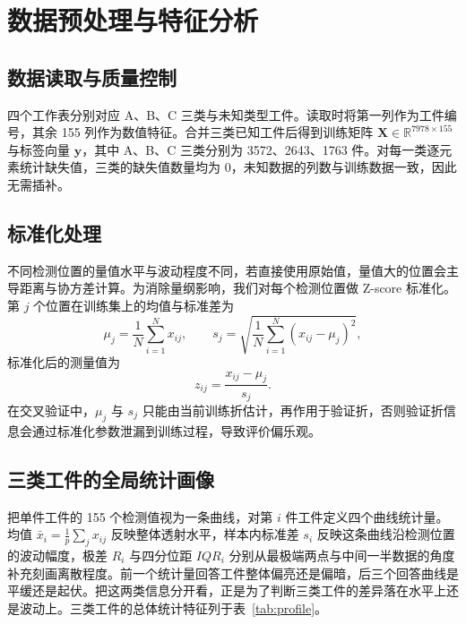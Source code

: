 \documentclass[12pt,a4paper]{article}
\begin{document}
\section{数据预处理与特征分析}
\subsection{数据读取与质量控制}

四个工作表分别对应 A、B、C 三类与未知类型工件。读取时将第一列作为工件编号，其余 155 列作为数值特征。合并三类已知工件后得到训练矩阵 $\mathbf{X}\in\mathbb{R}^{7978\times155}$ 与标签向量 $\mathbf{y}$，其中 A、B、C 三类分别为 3572、2643、1763 件。对每一类逐元素统计缺失值，三类的缺失值数量均为 0，未知数据的列数与训练数据一致，因此无需插补。

\subsection{标准化处理}

不同检测位置的量值水平与波动程度不同，若直接使用原始值，量值大的位置会主导距离与协方差计算。为消除量纲影响，我们对每个检测位置做 Z-score 标准化。第 $j$ 个位置在训练集上的均值与标准差为
\begin{equation}
\mu_j=\frac{1}{N}\sum_{i=1}^{N}x_{ij},\qquad
s_j=\sqrt{\frac{1}{N}\sum_{i=1}^{N}(x_{ij}-\mu_j)^2},
\end{equation}
标准化后的测量值为
\begin{equation}
z_{ij}=\frac{x_{ij}-\mu_j}{s_j}.
\end{equation}
在交叉验证中，$\mu_j$ 与 $s_j$ 只能由当前训练折估计，再作用于验证折，否则验证折信息会通过标准化参数泄漏到训练过程，导致评价偏乐观。

\subsection{三类工件的全局统计画像}

把单件工件的 155 个检测值视为一条曲线，对第 $i$ 件工件定义四个曲线统计量。均值 $\bar{x}_i=\frac{1}{p}\sum_j x_{ij}$ 反映整体透射水平，样本内标准差 $s_i$ 反映这条曲线沿检测位置的波动幅度，极差 $R_i$ 与四分位距 $IQR_i$ 分别从最极端两点与中间一半数据的角度补充刻画离散程度。前一个统计量回答工件整体偏亮还是偏暗，后三个回答曲线是平缓还是起伏。把这两类信息分开看，正是为了判断三类工件的差异落在水平上还是波动上。三类工件的总体统计特征列于表~\ref{tab:profile}。

\begin{table}[H]
\centering
\caption{三类工件的全局统计特征}
\label{tab:profile}
\end{table}
\end{document}
